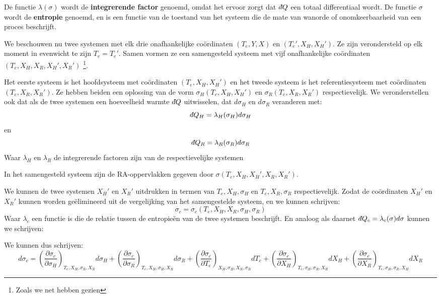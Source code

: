\begin{definition}
    De functie \(\lambda(\sigma)\) wordt de \textbf{integrerende factor} genoemd, omdat het ervoor zorgt dat \(\dbar Q\) een totaal differentiaal wordt. 
    De functie \(\sigma\) wordt de \textbf{entropie} genoemd, en is een functie van de toestand van het systeem die de mate van wanorde of onomkeerbaarheid van een proces beschrijft.
\end{definition}


\begin{derivation}
We beschouwen nu twee systemen met elk drie onafhankelijke coördinaten \((T_e, Y, X)\) en \((T_e', X_H, X_H')\). Ze zijn verondersteld op elk moment in evenwicht te zijn \(T_e = T_e'\).
Samen vormen ze een samengesteld systeem met vijf onafhankelijke coördinaten \((T_e, X_H, X_R, X_H', X_R')\) \footnote{Zoals we net hebben gezien}. 

Het eerste systeem is het hoofdsysteem met coördinaten \((T_e, X_H, X_H')\) en het tweede systeem is het referentiesysteem met coördinaten \((T_e, X_R, X_R')\).
Ze hebben beiden een oplossing van de vorm \(\sigma_H (T_e, X_H, X_H')\) en \(\sigma_R (T_e, X_R, X_R')\) respectievelijk.
We veronderstellen ook dat als de twee systemen een hoeveelheid warmte \(\dbar Q\) uitwisselen, dat \(d\sigma_H\) en \(d\sigma_R\) veranderen met:
\[\dbar Q_H = \lambda_H(\sigma_H) d\sigma_H\] en \[\dbar Q_R = \lambda_R(\sigma_R) d\sigma_R\]
Waar \(\lambda_H\) en \(\lambda_R\) de integrerende factoren zijn van de respectievelijke systemen

In het samengesteld systeem zijn de RA-oppervlakken gegeven door \(\sigma (T_e, X_H, X_H', X_R, X_R') \).

We kunnen de twee systemen  \(X_H'\) en \(X_R'\) uitdrukken in termen van \(T_e,X_H, \sigma_H\) en \(T_e, X_R, \sigma_R\) respectievelijk.
Zodat de coördinaten \(X_H'\) en \(X_R'\) kunnen worden geëlimineerd uit de vergelijking van het samengestelde systeem, en we kunnen schrijven:
\[\sigma_c = \sigma_c (T_e, X_H, X_R, \sigma_H, \sigma_R) \]
Waar \(\lambda_c\) een functie is die de relatie tussen de entropieën van de twee systemen beschrijft. 
En analoog als daarnet \( \dbar Q_c = \lambda_c(\sigma) d\sigma\) kunnen we schrijven:

We kunnen dus schrijven:
\tiny
\[d\sigma_c = \left(\frac{\partial \sigma_c}{\partial \sigma_H}\right)_{T_e, X_H, \sigma_R , X_R} d\sigma_H
 + \left(\frac{\partial \sigma_c}{\partial \sigma_R}\right)_{ T_e, X_H, \sigma_H, X_R} d\sigma_R
+ \left(\frac{\partial \sigma_c}{\partial T_e}\right)_{X_H, \sigma_H, X_R, \sigma_R} dT_e 
+ \left( \frac{\partial \sigma_c}{\partial X_H} \right)_{T_e, \sigma_H, \sigma_R, X_R} dX_H
+ \left(\frac{\partial \sigma_c}{\partial X_R} \right)_{T_e, \sigma_H, \sigma_R, X_H} dX_R\]
\normalsize


\end{derivation}
